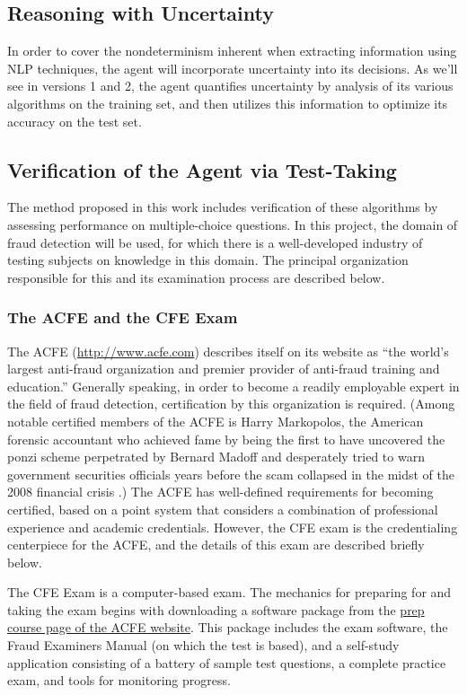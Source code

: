 \subsection{Reasoning with Uncertainty}

In order to cover the nondeterminism inherent when extracting information using NLP techniques, the agent will incorporate uncertainty into its decisions.  As we'll see in versions 1 and 2, the agent quantifies uncertainty by analysis of its various algorithms on the training set, and then utilizes this information to optimize its accuracy on the test set.

\subsection{Verification of the Agent via Test-Taking}

The method proposed in this work includes verification of these algorithms by assessing performance on multiple-choice questions.  In this project, the domain of fraud detection will be used, for which there is a well-developed industry of testing subjects on knowledge in this domain.  The principal organization responsible for this and its examination process are described below.

\subsubsection{The ACFE and the CFE Exam}


The ACFE (\url{http://www.acfe.com}) describes itself on its website as ``the world's largest anti-fraud organization and premier provider of anti-fraud training and education.''  Generally speaking, in order to become a readily employable expert in the field of fraud detection, certification by this organization is required.  (Among notable certified members of the ACFE is Harry Markopolos, the American forensic accountant who achieved fame by being the first to have uncovered the ponzi scheme perpetrated by Bernard Madoff and desperately tried to warn government securities officials years before the scam collapsed in the midst of the 2008 financial crisis \cite{markopolos2010}.)  The ACFE has well-defined requirements for becoming certified, based on a point system that considers a combination of professional experience and academic credentials.  However, the CFE exam is the credentialing centerpiece for the ACFE, and the details of this exam are described briefly below.

The CFE Exam is a computer-based exam.  The mechanics for preparing for and taking the exam begins with downloading a software package from the \href{http://www.acfe.com/CFE-Exam-Prep-Course-List.aspx}{prep course page of the ACFE website}.  This package includes the exam software, the Fraud Examiners Manual (on which the test is based), and a self-study application consisting of a battery of sample test questions, a complete practice exam, and tools for monitoring progress.  

